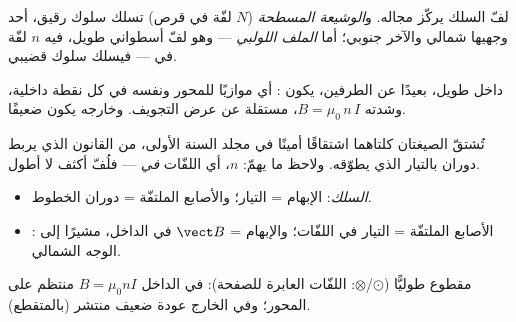 \begin{definition}\label{def:g11:magnetic-fields:solenoid}
لفّ السلك يركّز مجاله. و\emph{الوشيعة
المسطحة} ($N$ لفّة في قرص) تسلك سلوك  رقيق،
أحد وجهيها شمالي والآخر جنوبي؛ أما \emph{الملف اللولبي} ---
وهو لفّ أسطواني طويل، فيه $n$ لفّة في  --- فيسلك سلوك  قضيبي.
\end{definition}

\begin{proposition}\label{prop:g11:magnetic-fields:solenoidfield}
داخل  طويل، بعيدًا عن الطرفين، يكون 
\emph{}: أي موازيًا للمحور ونفسه في كل نقطة
داخلية، وشدته $B = \mu_0\, n\, I$، مستقلة عن عرض
التجويف. وخارجه يكون  ضعيفًا.
\end{proposition}
\admitted

\begin{remark}
تُشتقّ الصيغتان كلتاهما اشتقاقًا أمينًا في مجلد السنة الأولى، من القانون
الذي يربط دوران  بالتيار الذي يطوّقه. ولاحظ ما
يهمّ: $n$، أي اللفّات \emph{في } --- فلُفّ أكثف لا أطول.
\end{remark}

\begin{method}\label{met:g11:magnetic-fields:righthand}
\begin{itemize}
  \item \emph{السلك}: الإبهام = التيار؛ والأصابع الملتفّة = دوران الخطوط.
  \item \emph{ }: الأصابع الملتفّة = التيار في اللفّات؛
        والإبهام = $\vect B$ في الداخل، مشيرًا إلى الوجه الشمالي.
\end{itemize}
\end{method}

\begin{omfigure}

{\small {} مقطوع طوليًّا ($\odot$/$\otimes$: اللفّات
العابرة للصفحة): في الداخل $B = \mu_0 n I$ منتظم على المحور؛
وفي الخارج  عودة ضعيف منتشر (بالمتقطع).}
\end{omfigure}

